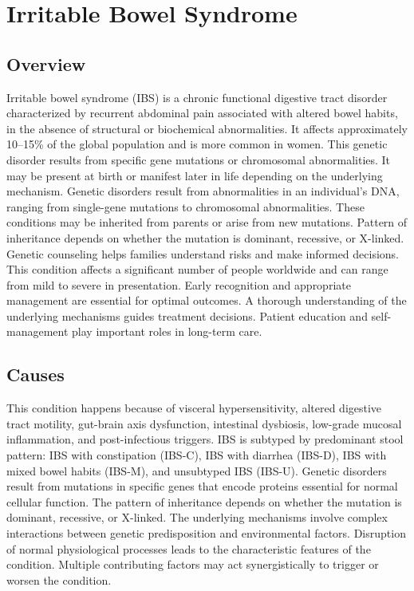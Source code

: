 \chapter{Irritable Bowel Syndrome}
\label{sec:Irritable Bowel Syndrome}

\section{Overview}
Irritable bowel syndrome (IBS) is a chronic functional digestive tract disorder characterized by recurrent abdominal pain associated with altered bowel habits, in the absence of structural or biochemical abnormalities. It affects approximately 10--15\% of the global population and is more common in women. This genetic disorder results from specific gene mutations or chromosomal abnormalities. It may be present at birth or manifest later in life depending on the underlying mechanism. Genetic disorders result from abnormalities in an individual's DNA, ranging from single-gene mutations to chromosomal abnormalities. These conditions may be inherited from parents or arise from new mutations. Pattern of inheritance depends on whether the mutation is dominant, recessive, or X-linked. Genetic counseling helps families understand risks and make informed decisions. This condition affects a significant number of people worldwide and can range from mild to severe in presentation. Early recognition and appropriate management are essential for optimal outcomes. A thorough understanding of the underlying mechanisms guides treatment decisions. Patient education and self-management play important roles in long-term care.
\section{Causes}
This condition happens because of visceral hypersensitivity, altered digestive tract motility, gut-brain axis dysfunction, intestinal dysbiosis, low-grade mucosal inflammation, and post-infectious triggers. IBS is subtyped by predominant stool pattern: IBS with constipation (IBS-C), IBS with diarrhea (IBS-D), IBS with mixed bowel habits (IBS-M), and unsubtyped IBS (IBS-U). Genetic disorders result from mutations in specific genes that encode proteins essential for normal cellular function. The pattern of inheritance depends on whether the mutation is dominant, recessive, or X-linked. The underlying mechanisms involve complex interactions between genetic predisposition and environmental factors. Disruption of normal physiological processes leads to the characteristic features of the condition. Multiple contributing factors may act synergistically to trigger or worsen the condition.
